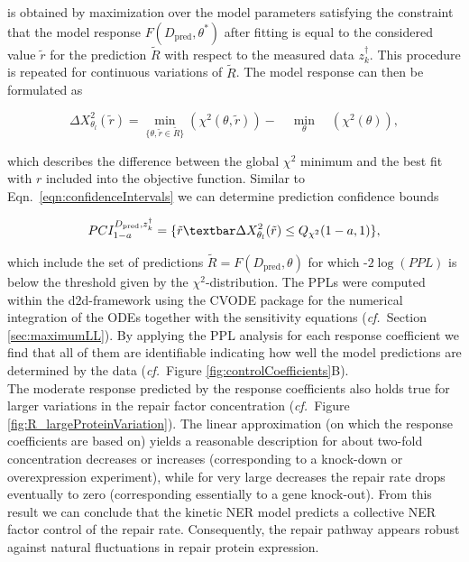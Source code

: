 is obtained by maximization over the model parameters satisfying the constraint that the model response $F(D_\text{pred}, \theta^\ast)$ after fitting is equal to the considered value $\tilde{r}$ for the prediction $\tilde{R}$ with respect to the measured data $z_k^\dag$. This procedure is repeated for continuous variations of $\tilde{R}$. The model response can then be formulated as 

\begin{equation}
\Delta X_{\theta_l}^2(\tilde{r}) = \min_{\{\theta, \tilde{r} \in \tilde{R}  \}} \left( \chi^{2} (\theta,\tilde{r} )\right)
- \quad  \min_{\theta} \quad  \left( \chi^{2} (\theta)\right),
\end{equation}

which describes the difference between the global $\chi^{2}$ minimum and the best fit with $r$ included into the objective function. Similar to Eqn.\ \ref{eqn:confidenceIntervals} we can determine prediction confidence bounds 

\begin{equation}
PCI_{1-a}^{D_{\text{pred}},z_k^\dag} = \{\tilde{r}\textbar \Delta X_{\theta_l}^2(\tilde{r})\leq Q_{\chi^{2}}(1-a,1)\},
\label{eqn:confidenceIntervalsPPL}
\end{equation}

which include the set of predictions $\tilde{R} = F(D_{\text{pred}},\theta)$ for which -$2\log(PPL)$ is below the threshold given by the $\chi^{2}$-distribution. The PPLs were computed within the d2d-framework \cite{Raue2013} using the CVODE package \cite{Hindmarsh2005} for the numerical integration of the ODEs together with the sensitivity equations (\textit{cf.}\ Section \ref{sec:maximumLL}).
By applying the PPL analysis for each response coefficient we find that all of them are identifiable indicating how well the model predictions are determined by the data (\textit{cf.}\ Figure \ref{fig:controlCoefficients}B).\\ The moderate response predicted by the response coefficients also holds true for larger variations in the repair factor concentration (\textit{cf.}\ Figure \ref{fig:R_largeProteinVariation}). The linear approximation (on which the response coefficients are based on) yields a reasonable description for about two-fold concentration decreases or increases (corresponding to a knock-down or overexpression experiment), while for very large decreases the repair rate drops eventually to zero (corresponding essentially to a gene knock-out). From this result we can conclude that the kinetic NER model predicts a collective NER factor control of the repair rate. Consequently, the repair pathway appears robust against natural fluctuations in repair protein expression.  


